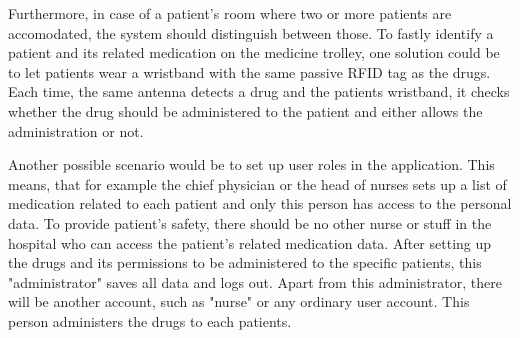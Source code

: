 Furthermore, in case of a patient's room where two or more patients are accomodated, the system should distinguish between those. To fastly identify a patient and its related medication on the medicine trolley, one solution could be to let patients wear a wristband with the same passive RFID tag as the drugs. Each time, the same antenna detects a drug and the patients wristband, it checks whether the drug should be administered to the patient and either allows the administration or not.

Another possible scenario would be to set up user roles in the application. This means, that for example the chief physician or the head of nurses sets up a list of medication related to each patient and only this person has access to the personal data. To provide patient's safety, there should be no other nurse or stuff in the hospital who can access the patient's related medication data. After setting up the drugs and its permissions to be administered to the specific patients, this "administrator" saves all data and logs out. 
Apart from this administrator, there will be another account, such as "nurse" or any ordinary user account. This person administers the drugs to each patients.